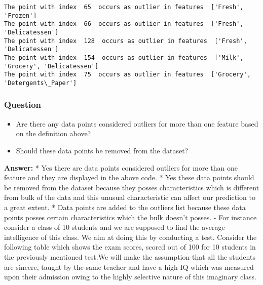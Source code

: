\documentclass[11pt]{article}
\providecommand{\tightlist}{%
      \setlength{\itemsep}{0pt}\setlength{\parskip}{0pt}}
\begin{document}
    \begin{Verbatim}[commandchars=\\\{\}]
The point with index  65  occurs as outlier in features  ['Fresh', 'Frozen']
The point with index  66  occurs as outlier in features  ['Fresh', 'Delicatessen']
The point with index  128  occurs as outlier in features  ['Fresh', 'Delicatessen']
The point with index  154  occurs as outlier in features  ['Milk', 'Grocery', 'Delicatessen']
The point with index  75  occurs as outlier in features  ['Grocery', 'Detergents\_Paper']

    \end{Verbatim}

    \subsubsection{Question}\label{question}

\begin{itemize}
\tightlist
\item
  Are there any data points considered outliers for more than one
  feature based on the definition above?
\item
  Should these data points be removed from the dataset?
\end{itemize}

    \textbf{Answer:} * Yes there are data points considered outliers for
more than one feature and they are displayed in the above code. * Yes
these data points should be removed from the dataset because they posses
characteristics which is different from bulk of the data and this
unusual characteristic can affect our prediction to a great extent. *
Data points are added to the outliers list because these data points
posses certain characteristics which the bulk doesn't posses. - For
instance consider a class of 10 students and we are supposed to find the
average intelligence of this class. We aim at doing this by conducting a
test. Consider the following table which shows the exam scores, scored
out of 100 for 10 students in the previously mentioned test.We will make
the assumption that all the students are sincere, taught by the same
teacher and have a high IQ which was measured upon their admission owing
to the highly selective nature of this imaginary class.
\end{document}
